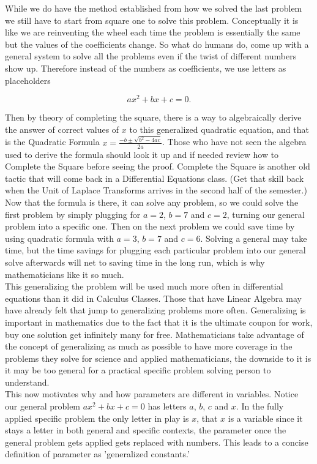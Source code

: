 \documentclass[12pt]{article}
\begin{document}
While we do have the method established from how we solved the last problem we still have to start from square one to solve this problem. Conceptually it is like we are reinventing the wheel each time the problem is essentially the same but the values of the coefficients change. So what do humans do, come up with a general system to solve all the problems even if the twist of different numbers show up. Therefore instead of the numbers as coefficients, we use letters as placeholders

\begin{equation*}
    ax^2+bx+c=0.
\end{equation*}

Then by theory of completing the square, there is a way to algebraically derive the answer of correct values of $x$ to this generalized quadratic equation, and that is the Quadratic Formula $x=\frac{-b \pm \sqrt{b^2-4ac}}{2a}$. Those who have not seen the algebra used to derive the formula should look it up and if needed review how to Complete the Square before seeing the proof. Complete the Square is another old tactic that will come back in a Differential Equations class. (Get that skill back when the Unit of Laplace Transforms arrives in the second half of the semester.) Now that the formula is there, it can solve any problem, so we could solve the first problem by simply plugging for $a=2$, $b=7$ and $c=2$, turning our general problem into a specific one. Then on the next problem we could save time by using quadratic formula with $a=3$, $b=7$ and $c=6$. Solving a general may take time, but the time savings for plugging each particular problem into our general solve afterwards will net to saving time in the long run, which is why mathematicians like it so much. \\

This generalizing the problem will be used much more often in differential equations than it did in Calculus Classes. Those that have Linear Algebra may have already felt that jump to generalizing problems more often. Generalizing is important in mathematics due to the fact that it is the ultimate coupon for work, buy one solution get infinitely many for free. Mathematicians take advantage of the concept of generalizing as much as possible to have more coverage in the problems they solve for science and applied mathematicians, the downside to it is it may be too general for a practical specific problem solving person to understand. \\

This now motivates why and how parameters are different in variables. Notice our general problem $ax^2+bx+c=0$ has letters $a$, $b$, $c$ and $x$. In the fully applied specific problem the only letter in play is $x$, that $x$ is a variable since it stays a letter in both general and specific contexts, the parameter once the general problem gets applied gets replaced with numbers. This leads to a concise definition of parameter as 'generalized constants.' \\
\end{document}
